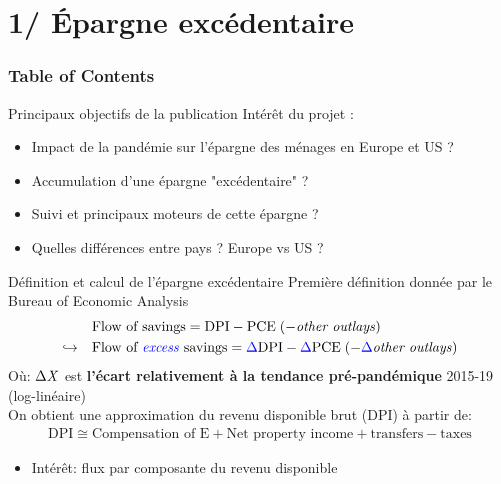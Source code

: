\documentclass[9pt, xcolor={dvipsnames}]{beamer}
\newcommand{\blue}[1]{\textcolor{blue}{#1}}
\begin{document}
\section{1/ Épargne excédentaire}
\begin{frame}
  \frametitle{Table of Contents}
  \tableofcontents[currentsection]
\end{frame}
\begin{frame}{Principaux objectifs de la publication}
  Intérêt du projet :
  \begin{itemize}
    \item Impact de la pandémie sur l'épargne des ménages en Europe et US ? 
    \item Accumulation d'une épargne "excédentaire" ? 
    \item Suivi et principaux moteurs de cette épargne ? 
    \item Quelles différences entre pays ? Europe vs US ?
  \end{itemize}
\end{frame}

\begin{frame}{Définition et calcul de l'épargne excédentaire}
  Première définition donnée par le Bureau of Economic Analysis
  \begin{align*}
    &\textrm{Flow of savings} = \textrm{DPI} - \textrm{PCE} \; (- \textrm{\textit{other outlays}}) \\
    \hookrightarrow \quad &\textrm{Flow of \blue{\textit{excess}} savings} = \blue{\Delta} \textrm{DPI} - \blue{\Delta} \textrm{PCE} \; (- \blue{\Delta} \textrm{\textit{other outlays}})
  \end{align*}
  Où: $\Delta \textrm{\textit{X}}$ est \textbf{l'écart relativement à la tendance pré-pandémique} 2015-19 (log-linéaire) \\ 
  \vspace{.3cm}
  On obtient une approximation du revenu disponible brut (DPI) à partir de:
  \begin{align*}
    \textrm{DPI} \cong  \textrm{Compensation of E} + \textrm{Net property income} + \textrm{transfers} - \textrm{taxes}
  \end{align*}
  \begin{itemize}
    \item Intérêt: flux par composante du revenu disponible
  \end{itemize}
\end{frame}
\end{document}
